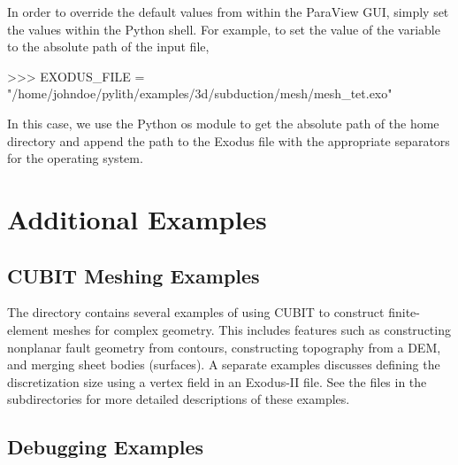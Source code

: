 In order to override the default values from within the ParaView GUI,
simply set the values within the Python shell. For example, to set the
value of the variable  to the absolute path of
the input file,
\begin{python}
>>> EXODUS_FILE = "/home/johndoe/pylith/examples/3d/subduction/mesh/mesh_tet.exo"
\end{python}
In this case, we use the Python os module to get the absolute path of
the home directory and append the path to the Exodus file with the
appropriate separators for the operating system.

















\section{Additional Examples}


\subsection{CUBIT Meshing Examples}

The directory  contains several examples
of using CUBIT to construct finite-element meshes for complex geometry.
This includes features such as constructing nonplanar fault geometry
from contours, constructing topography from a DEM, and merging sheet
bodies (surfaces). A separate examples discusses defining the discretization
size using a vertex field in an Exodus-II file. See the 
files in the subdirectories for more detailed descriptions of these
examples.


\subsection{Debugging Examples}
\label{sub:debugging:examples}

